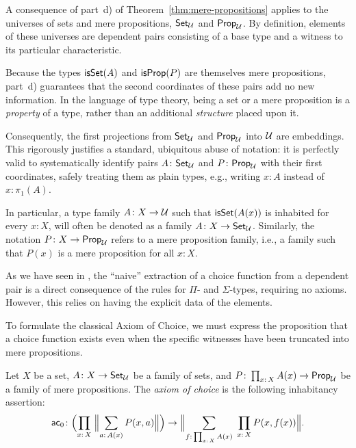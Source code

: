 \begin{rem}
    A consequence of part~d) of Theorem~\ref{thm:mere-propositions} applies to the universes of sets and mere propositions, $\mathsf{Set}_\mathcal U$ and $\mathsf{Prop}_\mathcal U$. By definition, elements of these universes are dependent pairs consisting of a base type and a witness to its particular characteristic. 
    
    Because the types $\mathsf{isSet}(A)$ and $\mathsf{isProp}(P)$ are themselves mere propositions, part~d) guarantees that the second coordinates of these pairs add no new information. In the language of type theory, being a set or a mere proposition is a \textit{property} of a type, rather than an additional \textit{structure} placed upon it. 

    Consequently, the first projections from $\mathsf{Set}_\mathcal U$ and $\mathsf{Prop}_\mathcal U$ into $\mathcal U$ are embeddings. This rigorously justifies a standard, ubiquitous abuse of notation: it is perfectly valid to systematically identify pairs $A\colon\fun{Set}_\univ$ and $P\colon\fun{Prop}_\univ$ with their first coordinates, safely treating them as plain types, e.g., writing $x\colon A$ instead of $x\colon\pi_1(A)$.

    In particular, a type family $A\colon X\to\univ$ such that $\mathsf{isSet}(A(x))$ is inhabited for every $x\colon X$, will often be denoted as a family $A\colon X\to\fun{Set}_\univ$. Similarly, the notation $P\colon X\to\fun{Prop}_\univ$ refers to a mere proposition family, i.e., a family such that $P(x)$ is a mere proposition for all $x\colon X$.
\end{rem}

\separator

As we have seen in , the ``naive'' extraction of a choice function from a dependent pair is a direct consequence of the rules for $\Pi$- and $\Sigma$-types, requiring no axioms. However, this relies on having the explicit data of the elements. 

To formulate the classical Axiom of Choice, we must express the proposition that a choice function exists even when the specific witnesses have been truncated into mere propositions. 

\begin{defn}\label{defn:tac}
    Let $X$ be a set, $A\colon X\to\fun{Set}_\univ$ be a family of sets, and $P\colon\prod_{x\colon X} A(x)\to\fun{Prop}_\univ$ be a family of mere propositions. The \textsl{axiom of choice} is the following inhabitancy assertion:
    \begin{equation}\label{eq:tac}
        \tac\colon
            \Bigl(
                \prod_{x\colon X}\;\Bigl\lVert\sum_{a\colon A(x)}P(x,a)\Bigr\rVert
            \Bigr)
            \to
            \Bigl\lVert
                \sum_{f\colon\prod_{x\colon X}A(x)}\;\prod_{x\colon X}P(x,f(x))
            \Bigr\rVert.
    \end{equation}
\end{defn}


